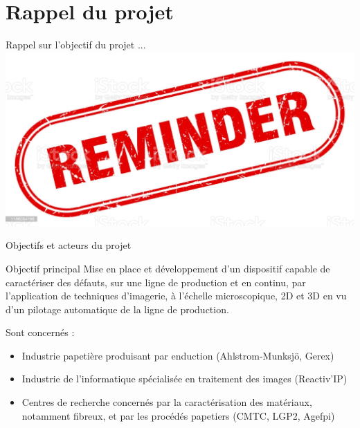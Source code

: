 \documentclass[8pt]{beamer}
\begin{document}
\section*{Rappel du projet}
	\begin{frame}{Rappel sur l'objectif du projet ...}
		\centering
		\includegraphics[width=.6\linewidth]{goal.jpg}
	\end{frame}
	\begin{frame}{Objectifs et acteurs du projet}
		\begin{minipage}[c]{.65\textwidth}
			\begin{block}{Objectif principal}
				Mise en place et développement d'un dispositif capable de caractériser des défauts, sur une ligne de production et en continu, par l'application de techniques d'imagerie, à l'échelle microscopique, 2D et 3D en vu d'un pilotage automatique de la ligne de production.
			\end{block}
			\begin{block}{Sont concernés :}
				\begin{itemize}
					\item Industrie papetière produisant par enduction (Ahlstrom-Munksjö, Gerex)
					\item Industrie de l'informatique spécialisée en traitement des images (Reactiv'IP)
					\item Centres de recherche concernés par la caractérisation des matériaux, notamment fibreux, et par les procédés papetiers (CMTC, LGP2, Agefpi)
				\end{itemize}
			\end{block}
		\end{minipage}\hfill
		\begin{minipage}[c]{.30\textwidth}
			\begin{center}

\end{center}
\end{minipage}
\end{frame}
\end{document}
